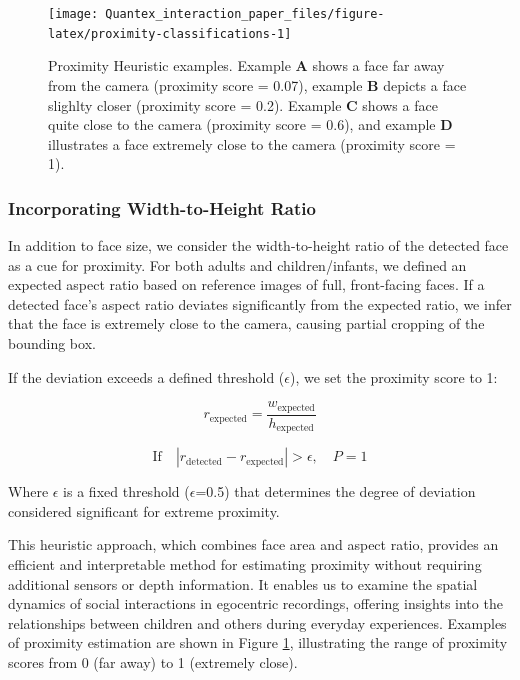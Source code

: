 \documentclass[
  man,floatsintext]{apa6}
\begin{document}
\begin{figure}

{\centering \texttt{[image: Quantex\_interaction\_paper\_files/figure-latex/proximity-classifications-1]} 

}

\caption{Proximity Heuristic examples. Example \textbf{A} shows a face far away from the camera (proximity score = 0.07), example \textbf{B} depicts a face slighlty closer (proximity score = 0.2). Example \textbf{C} shows a face quite close to the camera (proximity score = 0.6), and example \textbf{D} illustrates a face extremely close to the camera (proximity score = 1).}\label{fig:proximity-classifications}
\end{figure}

\subsubsection{Incorporating Width-to-Height Ratio}\label{incorporating-width-to-height-ratio}

In addition to face size, we consider the width-to-height ratio of the detected face as a cue for proximity. For both adults and children/infants, we defined an expected aspect ratio based on reference images of full, front-facing faces. If a detected face's aspect ratio deviates significantly from the expected ratio, we infer that the face is extremely close to the camera, causing partial cropping of the bounding box.

If the deviation exceeds a defined threshold (\(\epsilon\)), we set the proximity score to 1:

\[
r_{\text{expected}} = \frac{w_{\text{expected}}}{h_{\text{expected}}}
\]

\[
\text{If} \quad |r_{\text{detected}} - r_{\text{expected}}| > \epsilon, \quad P = 1
\]

Where \(\epsilon\) is a fixed threshold (\(\epsilon\)=0.5) that determines the degree of deviation considered significant for extreme proximity.

This heuristic approach, which combines face area and aspect ratio, provides an efficient and interpretable method for estimating proximity without requiring additional sensors or depth information. It enables us to examine the spatial dynamics of social interactions in egocentric recordings, offering insights into the relationships between children and others during everyday experiences. Examples of proximity estimation are shown in Figure \ref{fig:proximity-classifications}, illustrating the range of proximity scores from 0 (far away) to 1 (extremely close).
\end{document}
